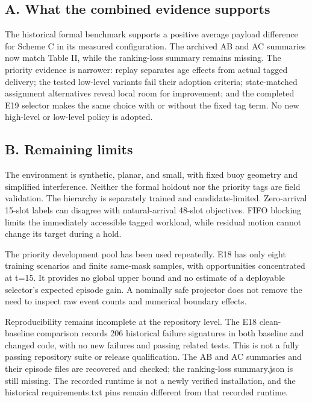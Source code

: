 \subsection*{A. What the combined evidence supports}

The historical formal benchmark supports a positive average payload difference for Scheme C in its measured configuration. The archived AB and AC summaries now match Table II, while the ranking-loss summary remains missing. The priority evidence is narrower: replay separates age effects from actual tagged delivery; the tested low-level variants fail their adoption criteria; state-matched assignment alternatives reveal local room for improvement; and the completed E19 selector makes the same choice with or without the fixed tag term. No new high-level or low-level policy is adopted.

\subsection*{B. Remaining limits}

The environment is synthetic, planar, and small, with fixed buoy geometry and simplified interference. Neither the formal holdout nor the priority tags are field validation. The hierarchy is separately trained and candidate-limited. Zero-arrival 15-slot labels can disagree with natural-arrival 48-slot objectives. FIFO blocking limits the immediately accessible tagged workload, while residual motion cannot change its target during a hold.

The priority development pool has been used repeatedly. E18 has only eight training scenarios and finite same-mask samples, with opportunities concentrated at t=15. It provides no global upper bound and no estimate of a deployable selector's expected episode gain. A nominally safe projector does not remove the need to inspect raw event counts and numerical boundary effects.

Reproducibility remains incomplete at the repository level. The E18 clean-baseline comparison records 206 historical failure signatures in both baseline and changed code, with no new failures and passing related tests. This is not a fully passing repository suite or release qualification. The AB and AC summaries and their episode files are recovered and checked; the ranking-loss summary.json is still missing. The recorded runtime is not a newly verified installation, and the historical requirements.txt pins remain different from that recorded runtime.

